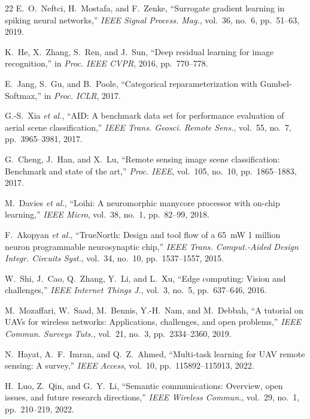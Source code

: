 \documentclass[conference]{IEEEtran}
\begin{document}
\begin{thebibliography}{22}
E.~O.~Neftci, H.~Mostafa, and F.~Zenke, ``Surrogate gradient learning in spiking neural networks,'' \emph{IEEE Signal Process. Mag.}, vol.~36, no.~6, pp.~51--63, 2019.

K.~He, X.~Zhang, S.~Ren, and J.~Sun, ``Deep residual learning for image recognition,'' in \emph{Proc. IEEE CVPR}, 2016, pp.~770--778.

E.~Jang, S.~Gu, and B.~Poole, ``Categorical reparameterization with Gumbel-Softmax,'' in \emph{Proc. ICLR}, 2017.

G.-S.~Xia \emph{et al.}, ``AID: A benchmark data set for performance evaluation of aerial scene classification,'' \emph{IEEE Trans. Geosci. Remote Sens.}, vol.~55, no.~7, pp.~3965--3981, 2017.

G.~Cheng, J.~Han, and X.~Lu, ``Remote sensing image scene classification: Benchmark and state of the art,'' \emph{Proc. IEEE}, vol.~105, no.~10, pp.~1865--1883, 2017.

M.~Davies \emph{et al.}, ``Loihi: A neuromorphic manycore processor with on-chip learning,'' \emph{IEEE Micro}, vol.~38, no.~1, pp.~82--99, 2018.

F.~Akopyan \emph{et al.}, ``TrueNorth: Design and tool flow of a 65~mW 1 million neuron programmable neurosynaptic chip,'' \emph{IEEE Trans. Comput.-Aided Design Integr. Circuits Syst.}, vol.~34, no.~10, pp.~1537--1557, 2015.

W.~Shi, J.~Cao, Q.~Zhang, Y.~Li, and L.~Xu, ``Edge computing: Vision and challenges,'' \emph{IEEE Internet Things J.}, vol.~3, no.~5, pp.~637--646, 2016.

M.~Mozaffari, W.~Saad, M.~Bennis, Y.-H.~Nam, and M.~Debbah, ``A tutorial on UAVs for wireless networks: Applications, challenges, and open problems,'' \emph{IEEE Commun. Surveys Tuts.}, vol.~21, no.~3, pp.~2334--2360, 2019.

N.~Hayat, A.~F.~Imran, and Q.~Z.~Ahmed, ``Multi-task learning for UAV remote sensing: A survey,'' \emph{IEEE Access}, vol.~10, pp.~115892--115913, 2022.

H.~Luo, Z.~Qin, and G.~Y.~Li, ``Semantic communications: Overview, open issues, and future research directions,'' \emph{IEEE Wireless Commun.}, vol.~29, no.~1, pp.~210--219, 2022.


\end{thebibliography}
\end{document}
